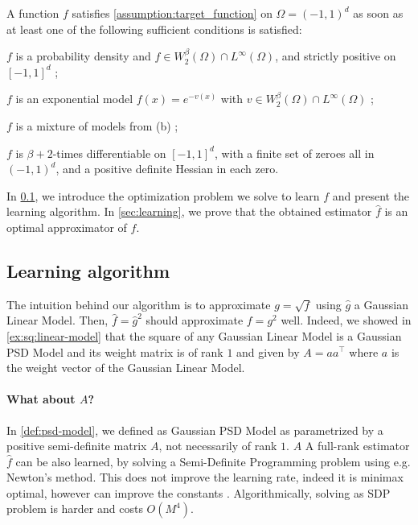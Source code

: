\begin{proposition}\label{prop:sufficient-conditions-target}
A function $f$ satisfies \cref{assumption:target_function} on $\Omega = (-1, 1)^d$ as soon as at least one of the following sufficient conditions is satisfied:
\begin{enumthm}
    \item $f$ is a probability density and $f\in W_2^\beta(\Omega)\cap L^\infty(\Omega)$, and strictly positive on $[-1, 1]^d$ ;
    \item $f$ is an exponential model $f(x) = e^{-v(x)}$ with $v\in W_2^\beta(\Omega) \cap L^\infty(\Omega)$ ;
    \item $f$ is a mixture of models from (b) ;
    \item $f$ is $\beta+2$-times differentiable on $[-1, 1]^d$, with a finite set of zeroes all in $(-1, 1)^d$, and a positive definite Hessian in each zero.
\end{enumthm}
\end{proposition}

In \cref{sec:optimization}, we introduce the optimization problem we solve to learn $f$ and present the learning algorithm. In \cref{sec:learning}, we prove that the obtained estimator $\hat f$ is an optimal approximator of $f$.

\subsection{Learning algorithm}\label{sec:optimization}
The intuition behind our algorithm is to approximate $g=\sqrt{f}$ using $\hat g$ a Gaussian Linear Model. Then, $\hat f = \hat g^2$ should approximate $f=g^2$ well. Indeed, we showed in \cref{ex:sq:linear-model} that the square of any Gaussian Linear Model is a Gaussian PSD Model and its weight matrix is of rank $1$ and given by $A =aa^\top $ where $a$ is the weight vector of the Gaussian Linear Model.

\paragraph{What about $A$?} In \cref{def:psd-model}, we defined as Gaussian PSD Model as parametrized by a positive semi-definite matrix $A$, not necessarily of rank $1$. $A$ A full-rank estimator $\hat f$ can be also learned, by solving a Semi-Definite Programming problem using e.g. Newton's method. This does not improve the learning rate, indeed it is minimax optimal, however can improve the constants . Algorithmically, solving as SDP problem is harder and costs $O(M^4)$.

